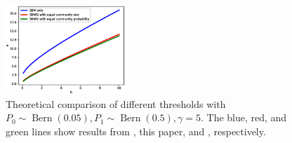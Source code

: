 \documentclass[conference]{IEEEtran}
\DeclareMathOperator{\Bern}{Bern}
\begin{document}
	\begin{figure}
	    \centering
	    \includegraphics[width=0.4\textwidth]{comparison.eps}
	    \caption{Theoretical comparison of different thresholds with $P_0 \sim \Bern(0.05), P_1\sim \Bern(0.5), \gamma=5$. The blue, red, and green lines show results from \cite{abbe2015exact}, this paper, and \cite{abbe17sideinfo}, respectively.}
	    \label{fig:my_label}
	\end{figure}
\end{document}
